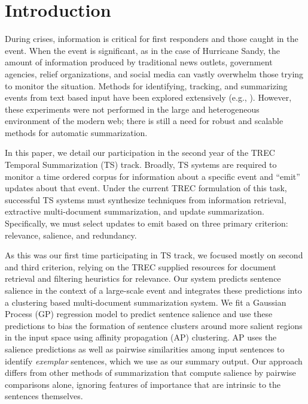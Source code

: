 \section{Introduction}
\label{sec:introduction}
During crises, information is critical for first responders and those caught
in the event.  When the event is significant, as in the case of Hurricane
Sandy, the amount of information produced by traditional news outlets,
government agencies, relief organizations, and social media can vastly
overwhelm those trying to monitor the situation. Methods for identifying,
tracking, and summarizing events from text based input have been explored
extensively  (e.g.,
\cite{allan1998topic,Filatova&Hatzivassiloglou.04a,Wang&al.11}). However,
these experiments were not performed in the large and heterogeneous
environment of the modern web; there is still a need for robust and scalable 
methods for automatic summarization.




In this paper, we detail our participation in the second year of the TREC
Temporal Summarization (TS) track. Broadly, TS systems are required to monitor
a time ordered corpus for information about a specific event and ``emit'' 
updates about that event. Under the current TREC formulation of this task,
successful TS systems must synthesize techniques from information retrieval,
 extractive multi-document summarization, and update summarization.
Specifically, we must select updates to emit based on three primary criterion:
relevance, salience, and redundancy.

As this was our first time participating in TS track, we focused mostly on 
second and third criterion, relying on the TREC supplied resources for 
document retrieval and filtering heuristics for relevance.
Our system predicts sentence salience in the context of a
large-scale event and integrates these predictions into
a clustering based multi-document summarization system. We fit a Gaussian 
Process (GP) regression model to predict sentence salience and use 
these predictions to bias the
formation of sentence clusters around more salient regions in the input space
using affinity propagation (AP) clustering.  AP uses the salience predictions
as well as pairwise similarities among input sentences to identify
\emph{exemplar} sentences, which we use as our summary output.  Our approach
differs from other methods of summarization that compute salience by pairwise
comparisons alone, ignoring features of importance that are intrinsic to the
sentences themselves.

